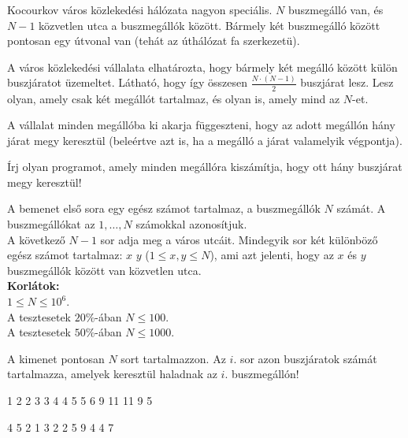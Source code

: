 





Kocourkov város közlekedési hálózata nagyon speciális. $N$ buszmegálló van, és $N-1$ közvetlen utca a buszmegállók között. Bármely két buszmegálló között pontosan egy útvonal van (tehát az úthálózat fa szerkezetü).

A város közlekedési vállalata elhatározta, hogy bármely két megálló között külön buszjáratot üzemeltet.
Látható, hogy így összesen $\frac{N \cdot (N - 1)}{2}$ buszjárat lesz. Lesz olyan, amely csak két megállót tartalmaz, és olyan is, amely mind az $N$-et.

A vállalat minden megállóba ki akarja függeszteni, hogy az adott megállón hány járat megy keresztül (beleértve azt is, ha a megálló a járat valamelyik végpontja).


Írj olyan programot, amely minden megállóra kiszámítja, hogy ott hány buszjárat megy keresztül!


A bemenet első sora egy egész számot tartalmaz, a buszmegállók $N$ számát. A buszmegállókat az $1,\ldots,N$ számokkal azonosítjuk.\\
A következő $N-1$ sor adja meg a város utcáit. Mindegyik sor két különböző egész számot tartalmaz: $x \,\, y$  ($1 \le x, y \le N$), ami azt jelenti, hogy az $x$ és $y$ buszmegállók között van közvetlen utca.\\
\smallskip
\noindent \textbf{Korlátok:}\\
 $1 \leq N \leq 10^6$.\\
A tesztesetek $20\%$-ában  $N \leq 100$.\\
A tesztesetek $50\%$-ában $N \leq 1000$.

A kimenet pontosan $N$ sort tartalmazzon. Az $i$. sor azon buszjáratok számát tartalmazza, amelyek keresztül haladnak az $i$. buszmegállón!


1 2
2 3
3 4
4 5
5 6
9
11
11
9
5
\sampleEND

\bigskip

4 5
2 1
3 2
2 5
9
4
4
7
\sampleEND


